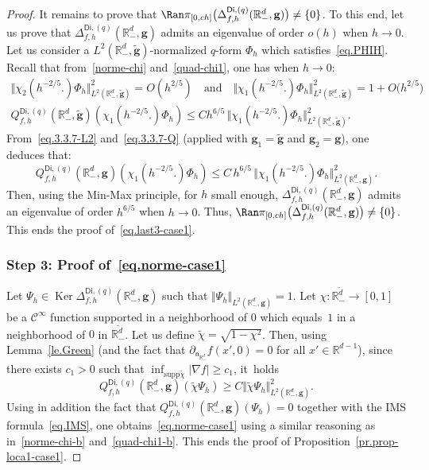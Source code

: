 \documentclass[JEP,XML,SOM,Unicode,NoEqCountersInSection,NoFloatCountersInSection,published]{cedram}
\newcommand{\quand}{\quad\text{and}\quad}
\newcommand{\mbf}[1]{\mathbf{#1}}
\DeclareMathOperator\Ker{Ker}
\theoremstyle{plain}
\theoremstyle{definition}
\begin{document}
\begin{proof}
It remains to prove that $\Ran \pi_{[0,ch]}\bigl(\Delta_{f,h}^{\mathsf{Di},(q)}(\mathbb R_-^d, \mbf g) \bigr)\neq \{0\}$. To this end, let us prove that $
\Delta_{f,h}^{\mathsf{Di},(q)}(\mathbb R^d_-,\mbf g)$ admits an eigenvalue of order $o(h)$ when $h\to 0$.
Let us consider a $L^2(\mathbb R^d_-,\tilde{\mbf g})$-normalized $q$-form $\Phi_h$ which satisfies~\eqref{eq.PHIH}.
Recall that from~\eqref{norme-chi} and~\eqref{quad-chi1}, one has when $h\to 0$:
\begin{gather*}
\big\Vert \chi_2(h^{-2/5 }.) \Phi_h\big \Vert_{L^2(\mathbb R_-^d,\tilde{\mbf g})}^2 =O(h^{2/5 }) \quand \big\Vert \chi_1(h^{-2/5 }.) \Phi_h\big\Vert_{L^2(\mathbb R_-^d,\tilde{\mbf g})}^2=1+O\bigl(h^{2/5 }\bigr)
\\
\tag*{and}
Q_{f,h}^{\mathsf{Di},(q)}(\mathbb R^d_-,\tilde{\mbf g})(\chi_1(h^{-2/5 }.)\Phi_h)\le C h^{ 6/5} \, \big \Vert \chi_1(h^{-2/5 }.)\Phi_h\big \Vert_{L^2(\mathbb R^d_-,\tilde{\mbf g})}^2.
\end{gather*}
From~\eqref{eq.3.3.7-L2} and~\eqref{eq.3.3.7-Q} (applied with $\mbf g_1=\tilde{\mbf g}$ and $\mbf g_2=\mbf g$), one deduces that:
\begin{equation}\label{bes2}
Q_{f,h}^{\mathsf{Di},(q)}(\mathbb R^d_-,\mbf g)(\chi_1(h^{-2/5 }.)\Phi_h)\le C\, h^{6/5}\, \big \Vert \chi_1(h^{-2/5 }.)\Phi_h\big \Vert_{L^2(\mathbb R^d_-,\mbf g)}^2.
\end{equation}
Then, using the Min-Max principle, for $h$ small enough, $
\Delta_{f,h}^{\mathsf{Di},(q)}(\mathbb R^d_-,\mbf g)$ admits an eigenvalue of order $ h^{ 6/5}$ when $h\to 0$. Thus, $\Ran \pi_{[0,ch]}\bigl(\Delta_{f,h}^{\mathsf{Di},(q)}(\mathbb R_-^d, \mbf g) \bigr)\neq \{0\}$.
This ends the proof of~\eqref{eq.last3-case1}.

\subsubsection*{Step 3: Proof of~\eqref{eq.norme-case1}}
Let $\Psi_h\in \Ker \Delta_{f,h}^{\mathsf{Di},(q)}(\mathbb R^d_-,\mbf g)$ such that $ \Vert \Psi_h \Vert_{L^2(\mathbb R^d_-,\mbf g)}=1$. Let $\chi: \overline{\mathbb R^{d}_-}\to [0,1]$ be a $\mathcal C^\infty$ function supported in a neighborhood of $0$ which equals~$1$ in a neighborhood of $0$ in $\overline{\mathbb R^{d}_-}$. Let us define $\tilde \chi=\sqrt{1-\chi^2}$. Then, using Lemma~\ref{le.Green} (and the fact that $\partial_{\mathsf n_{\mathbb R^d_-}}f(x',0)=0$ for all $x'\in \mathbb R^{d-1}$), since there exists $c_1>0$ such that $\inf_{\text{supp}\tilde \chi}\vert \nabla f\vert \ge c_1 $, it~holds
\[
Q_{f,h}^{\mathsf{Di},(q)}(\mathbb R^d_-,\mbf g)(\tilde \chi \Psi_h)\ge C \big \Vert \tilde \chi \Psi_h\big \Vert_{L^2(\mathbb R^d_-,\mbf g)}^2.
\]
Using in addition the fact that $Q_{f,h}^{\mathsf{Di},(q)}(\mathbb R^d_-,\mbf g)(\Psi_h)=0$ together with the IMS formula~\eqref{eq.IMS}, one obtains~\eqref{eq.norme-case1} using a similar reasoning as in~\eqref{norme-chi-b} and~\eqref{quad-chi1-b}. This ends the proof of Proposition~\ref{pr.prop-loca1-case1}.
\end{proof}
\end{document}
